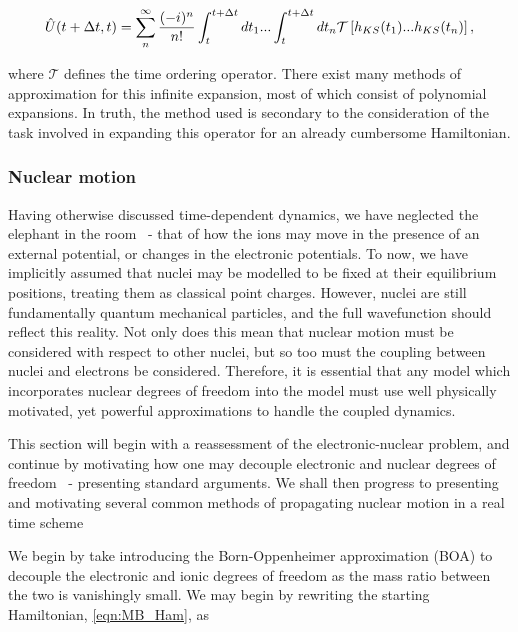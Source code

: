 \begin{equation}
    \Hat{U}(t+\Delta t, t) = \sum_{n}^{\infty} \frac{(-i)^{n}}{n!} \int_{t}^{t+\Delta t} dt_{1} ... \int_{t}^{t+\Delta t} dt_{n} \mathcal{T}\left[ h_{KS}(t_{1}) ... h_{KS}(t_{n}) \right],
    \label{eqn:UTE}
\end{equation}

where $\mathcal{T}$ defines the time ordering operator. There exist many methods of approximation for this infinite expansion, most of which consist of polynomial expansions. In truth, the method used is secondary to the consideration of the task involved in expanding this operator for an already cumbersome Hamiltonian.

\subsubsection{Nuclear motion}
\label{sec:nuclear_motion}

Having otherwise discussed time-dependent dynamics, we have neglected the elephant in the room ~- that of how the ions may move in the presence of an external potential, or changes in the electronic potentials. To now, we have implicitly assumed that nuclei may be modelled to be fixed at their equilibrium positions, treating them as classical point charges. However, nuclei are still fundamentally quantum mechanical particles, and the full wavefunction should reflect this reality. Not only does this mean that nuclear motion must be considered with respect to other nuclei, but so too must the coupling between nuclei and electrons be considered. Therefore, it is essential that any model which incorporates nuclear degrees of freedom into the model must use well physically motivated, yet powerful approximations to handle the coupled dynamics. 

This section will begin with a reassessment of the electronic-nuclear problem, and continue by motivating how one may decouple electronic and nuclear degrees of freedom ~- presenting standard arguments. We shall then progress to presenting and motivating several common methods of propagating nuclear motion in a real time scheme

We begin by take introducing the Born-Oppenheimer approximation (BOA) to decouple the electronic and ionic degrees of freedom as the mass ratio between the two is vanishingly small. We may begin by rewriting the starting Hamiltonian, \ref{eqn:MB_Ham}, as

